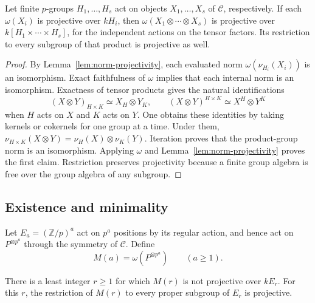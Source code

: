 \begin{lemma}\label{lem:internal-norm-products}
Let finite $p$-groups $H_1,\dots,H_s$ act on objects
$X_1,\dots,X_s$ of $\mathcal C$, respectively.  If each
$\omega(X_i)$ is projective over $kH_i$, then
$\omega(X_1\otimes\cdots\otimes X_s)$ is projective over
$k[H_1\times\cdots\times H_s]$, for the independent actions on the
tensor factors.  Its restriction to every subgroup of that product is
projective as well.
\end{lemma}

\begin{proof}
By Lemma~\ref{lem:norm-projectivity}, each evaluated norm
$\omega(\nu_{H_i}(X_i))$ is an isomorphism.  Exact faithfulness of
$\omega$ implies that each internal norm is an isomorphism.
Exactness of tensor products gives the natural identifications
\[
 (X\otimes Y)_{H\times K}\simeq X_H\otimes Y_K,
 \qquad
 (X\otimes Y)^{H\times K}\simeq X^H\otimes Y^K
\]
when $H$ acts on $X$ and $K$ acts on $Y$.  One obtains these identities
by taking kernels or cokernels for one group at a time.  Under them,
$\nu_{H\times K}(X\otimes Y)=\nu_H(X)\otimes\nu_K(Y)$.
Iteration proves that the product-group norm is an isomorphism.
Applying $\omega$ and Lemma~\ref{lem:norm-projectivity} proves the first
claim.  Restriction preserves projectivity because a finite group algebra
is free over the group algebra of any subgroup.
\end{proof}

\subsection{Existence and minimality}

Let $E_a=(\mathbb Z/p)^a$ act on $p^a$ positions by its regular action,
and hence act on $P^{\otimes p^a}$ through the symmetry of $\mathcal C$.
Define
\[
 M(a)=\omega(P^{\otimes p^a})\qquad(a\ge1).
\]

\begin{proposition}\label{prop:first-nonprojective}
There is a least integer $r\ge1$ for which $M(r)$ is not projective over
$kE_r$.  For this $r$, the restriction of $M(r)$ to every proper subgroup
of $E_r$ is projective.
\end{proposition}

